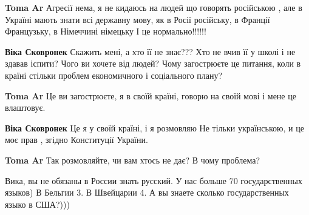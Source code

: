 \begin{itemize}
\begin{itemize}
\textbf{Toma Ar} Агресії нема, я не кидаюсь на людей що говорять російською , але в Україні мають знати всі державну мову, як в Росії російську, в Франції Французьку, в Німеччині німецьку І це нормально!!!!!!

\textbf{Віка Сковронек} Скажить мені, а хто її не знає??? Хто не вчив її у школі і не здавав іспити? Чого ви хочете від людей? Чому загострюєте це питання, коли в країні стільки проблем економичного і соціального плану?

\textbf{Toma Ar} Це ви загострюєте, я в своїй країні, говорю на своїй мові і мене це влаштовує.

\textbf{Віка Сковронек} Це я у своїй країні, і я розмовляю Не тільки українською, и це моє прав , згідно Конституції України.

\textbf{Toma Ar} Так розмовляйте, чи вам хтось не дає? В чому проблема?

Вика, вы не обязаны в России знать русский. У нас больше 70 государственных языков) В Бельгии 3. В Швейцарии 4.
А вы знаете сколько государственных языко в США?)))
\end{itemize}

\end{itemize}


